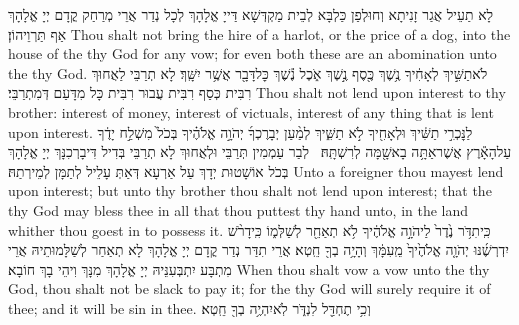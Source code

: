 {לָא תַעֵיל אֲגַר זָנִיתָא וְחוּלְפַן כַּלְבָּא לְבֵית מַקְדְּשָׁא דַּייָ אֱלָהָךְ לְכָל נְדַר אֲרֵי מְרַחַק קֳדָם יְיָ אֱלָהָךְ אַף תַּרְוֵיהוֹן׃}
{Thou shalt not bring the hire of a harlot, or the price of a dog, into the house of the \lord\space thy God for any vow; for even both these are an abomination unto the \lord\space thy God.}{}
{לֹא\maqqaf תַשִּׁ֣יךְ לְאָחִ֔יךָ נֶ֥שֶׁךְ כֶּ֖סֶף נֶ֣שֶׁךְ אֹ֑כֶל נֶ֕שֶׁךְ כׇּל\maqqaf דָּבָ֖ר אֲשֶׁ֥ר יִשָּֽׁךְ׃}
{לָא תְרַבֵּי לַאֲחוּךְ רִבִּית כְּסַף רִבִּית עֲבוּר רִבִּית כָּל מִדָּעַם דְּמִתְרַבֵּי׃}
{Thou shalt not lend upon interest to thy brother: interest of money, interest of victuals, interest of any thing that is lent upon interest.}{}
{לַנׇּכְרִ֣י תַשִּׁ֔יךְ וּלְאָחִ֖יךָ לֹ֣א תַשִּׁ֑יךְ לְמַ֨עַן יְבָרֶכְךָ֜ יְהֹוָ֣ה אֱלֹהֶ֗יךָ בְּכֹל֙ מִשְׁלַ֣ח יָדֶ֔ךָ עַל\maqqaf הָאָ֕רֶץ אֲשֶׁר\maqqaf אַתָּ֥ה בָא\maqqaf שָׁ֖מָּה לְרִשְׁתָּֽהּ׃ \setuma }
{לְבַר עַמְמִין תְּרַבֵּי וּלְאֲחוּךְ לָא תְרַבֵּי בְּדִיל דִּיבָרְכִנָּךְ יְיָ אֱלָהָךְ בְּכֹל אוֹשָׁטוּת יְדָךְ עַל אַרְעָא דְּאַתְּ עָלֵיל לְתַמָּן לְמֵירְתַהּ׃}
{Unto a foreigner thou mayest lend upon interest; but unto thy brother thou shalt not lend upon interest; that the \lord\space thy God may bless thee in all that thou puttest thy hand unto, in the land whither thou goest in to possess it.}{}
{כִּֽי\maqqaf תִדֹּ֥ר נֶ֙דֶר֙ לַיהֹוָ֣ה אֱלֹהֶ֔יךָ לֹ֥א תְאַחֵ֖ר לְשַׁלְּמ֑וֹ כִּֽי\maqqaf דָרֹ֨שׁ יִדְרְשֶׁ֜נּוּ יְהֹוָ֤ה אֱלֹהֶ֙יךָ֙ מֵֽעִמָּ֔ךְ וְהָיָ֥ה בְךָ֖ חֵֽטְא׃}
{אֲרֵי תִדַּר נְדַר קֳדָם יְיָ אֱלָהָךְ לָא תְאַחַר לְשַׁלָּמוּתֵיהּ אֲרֵי מִתְבָּע יִתְבְּעִנֵּיהּ יְיָ אֱלָהָךְ מִנָּךְ וִיהֵי בָךְ חוֹבָא׃}
{When thou shalt vow a vow unto the \lord\space thy God, thou shalt not be slack to pay it; for the \lord\space thy God will surely require it of thee; and it will be sin in thee.}{}
{וְכִ֥י תֶחְדַּ֖ל לִנְדֹּ֑ר לֹֽא\maqqaf יִהְיֶ֥ה בְךָ֖ חֵֽטְא׃}
